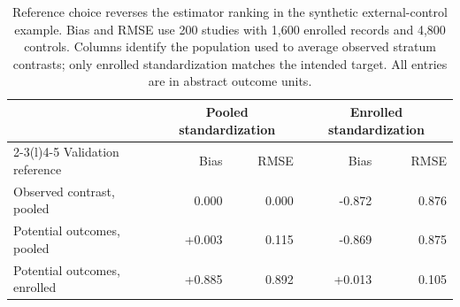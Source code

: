 \begin{table}[htbp]
\centering\small
\caption{Reference choice reverses the estimator ranking in the synthetic
external-control example. Bias and RMSE use 200 studies with 1{,}600 enrolled
records and 4{,}800 controls. Columns identify the population used to average
observed stratum contrasts; only enrolled standardization matches the intended
target. All entries are in abstract outcome units.}
\label{tab:eca}
\begin{tabular}{@{}lrrrr@{}}
\toprule
& \multicolumn{2}{c}{Pooled standardization} & \multicolumn{2}{c}{Enrolled standardization} \\
\cmidrule(lr){2-3}\cmidrule(l){4-5}
Validation reference & Bias & RMSE & Bias & RMSE \\
\midrule
Observed contrast, pooled & 0.000 & 0.000 & -0.872 & 0.876 \\
Potential outcomes, pooled & +0.003 & 0.115 & -0.869 & 0.875 \\
Potential outcomes, enrolled & +0.885 & 0.892 & +0.013 & 0.105 \\
\bottomrule
\end{tabular}
\end{table}
